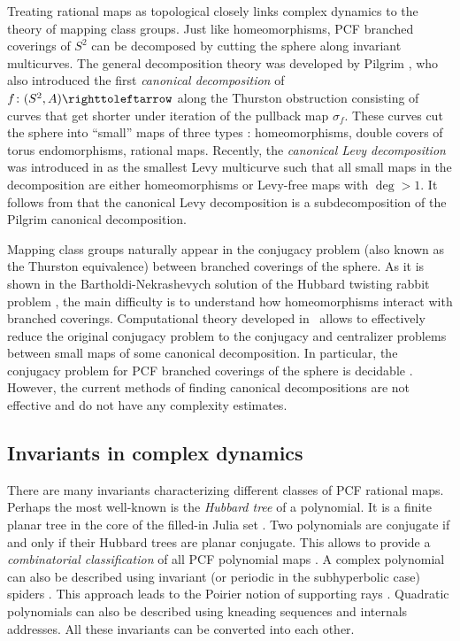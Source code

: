 \documentclass{amsart}
\theoremstyle{plain}
\theoremstyle{definition}
\theoremstyle{remark}
\newcommand\selfmap{\righttoleftarrow}
\begin{document}
Treating rational maps as topological closely links complex dynamics to the theory of mapping class groups. Just like homeomorphisms,  PCF branched coverings of $S^2$ can be decomposed by cutting the sphere along invariant multicurves. The general decomposition theory was developed by Pilgrim  \cite{Pilgrim_Comb}, who also introduced the first \emph{canonical decomposition} of $f\colon(S^2,A)\selfmap$ along the Thurston obstruction consisting of curves that get shorter  under iteration of the pullback map $\sigma_f$.  These curves cut the sphere into ``small'' maps of three types  \cite{SelingerPullback}: homeomorphisms, double covers of torus endomorphisms, rational maps.  Recently, the \emph{canonical Levy decomposition} was introduced in \cite{BD_Exp} as the smallest Levy multicurve such that all small maps in the decomposition are either homeomorphisms or Levy-free maps with $\deg >1$.  It follows from \cite{SelingerPullback, SY_Decid} that the canonical Levy decomposition is a subdecomposition of the Pilgrim canonical decomposition.  






Mapping class groups naturally appear in the conjugacy problem (also known as the Thurston equivalence) between branched coverings of the sphere. As it is shown in the Bartholdi-Nekrashevych solution of the Hubbard twisting rabbit problem \cite{BarNekr_Twist},  the main difficulty is to understand how homeomorphisms interact with branched coverings.   
Computational theory developed in~\cite{BD_Dec} allows to effectively reduce the original conjugacy problem to the conjugacy and centralizer problems between small maps of some canonical decomposition.  In particular, the conjugacy problem for PCF branched coverings of the sphere  is decidable \cite{BD_Algo}.  However, the current methods of finding canonical decompositions are not effective and do not have any complexity estimates.




\subsection{Invariants in complex dynamics} There are many invariants characterizing different classes of PCF rational maps. Perhaps the most well-known is the \emph{Hubbard tree} of a polynomial. It is a finite planar tree in the core of the filled-in Julia set \cite{DH_Orsay}. Two polynomials are conjugate if and only if their Hubbard trees are planar conjugate.  This allows to provide a \emph{combinatorial classification} of all PCF polynomial maps \cite{BFH_Class,Poirier}.  A complex polynomial can also be described using invariant (or periodic in the subhyperbolic case) spiders \cite{HS_Spider}. This approach leads to the Poirier notion of supporting rays \cite{Poirier}. Quadratic polynomials can also be described using kneading sequences and internals addresses. All these invariants can be converted into each other.
\end{document}
